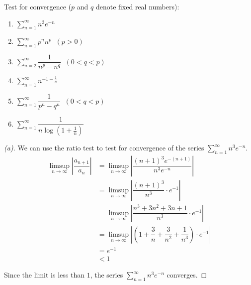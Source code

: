 \documentclass{article}
\begin{document}
\thispagestyle{empty}

\titleBC

\begin{question*}
    Test for convergence ($p$ and $q$ denote fixed real numbers):
    \begin{enumerate}[label=(\alph*)]
        \item $\displaystyle\sum_{n=1}^{\infty} n^3 e^{-n}$
        \item $\displaystyle\sum_{n=1}^{\infty} p^n n^p  \; \; (p > 0)$
        \item $\displaystyle\sum_{n=2}^{\infty} \dfrac{1}{n^p - n^q} \; \; (0 < q < p)$
        \item $\displaystyle\sum_{n=1}^{\infty} n^{-1 - \frac{1}{n}}$
        \item $\displaystyle\sum_{n=1}^{\infty} \dfrac{1}{p^n - q^n} \; \; (0 < q < p)$
        \item $\displaystyle\sum_{n=1}^{\infty} \dfrac{1}{n \log(1 + \frac{1}{n})}$
    \end{enumerate}
\end{question*}

\begin{proof}[(a)]
    We can use the ratio test to test for convergence of the series $\displaystyle\sum_{n=1}^{\infty} n^3 e^{-n}$.
    \begin{align*}
        \limsup\limits_{n \to \infty} \left| \dfrac{a_{n+1}}{a_n} \right| 
        &= \limsup\limits_{n \to \infty} \left| \dfrac{(n+1)^3 e^{-(n+1)}}{n^3 e^{-n}} \right| \\
        &= \limsup\limits_{n \to \infty} \left| \dfrac{(n+1)^3}{n^3} \cdot e^{-1} \right| \\
        &= \limsup\limits_{n \to \infty} \left| \dfrac{n^3 + 3n^2 + 3n + 1}{n^3} \cdot e^{-1} \right| \\
        &= \limsup\limits_{n \to \infty} \left| \left( 1 + \dfrac{3}{n} + \dfrac{3}{n^2} + \dfrac{1}{n^3} \right) \cdot e^{-1} \right| \\
        &= e^{-1} \\ 
        &< 1
    \end{align*}

    Since the limit is less than $1$, the series $\displaystyle\sum_{n=1}^{\infty} n^3 e^{-n}$ converges.
\end{proof}
\end{document}
